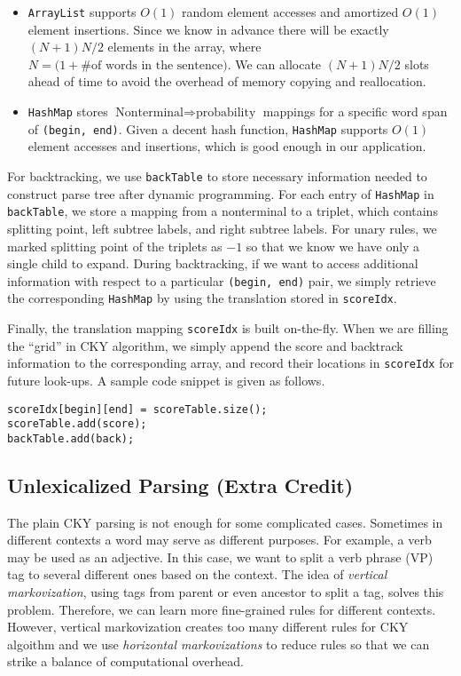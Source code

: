 \documentclass[letterpaper]{article}
\begin{document}
\begin{itemize}
\item \texttt{ArrayList} supports $O(1)$ random element accesses and amortized $O(1)$ element insertions. Since we know in advance there will be exactly $(N+1) N / 2$ elements in the array, where $N = \Big( 1 + \#\textrm{of words in the sentence} \Big)$. We can allocate $(N+1) N/2$ slots ahead of time
to avoid the overhead of memory copying and reallocation.

\item \texttt{HashMap} stores $\textrm{Nonterminal} \Longrightarrow \textrm{probability}$ mappings for a specific word span of \texttt{(begin, end)}. Given a decent hash function, \texttt{HashMap} supports $O(1)$ element accesses and insertions, which is good enough in our application.
\end{itemize}

For backtracking, we use \texttt{backTable} to store necessary information needed to construct parse tree after dynamic programming.
For each entry of \texttt{HashMap} in \texttt{backTable}, we store a mapping from a nonterminal to a triplet, which contains splitting point, left subtree labels, and right subtree labels.
For unary rules, we marked splitting point of the triplets as $-1$ so that we know we have only a single child to expand.
During backtracking, if we want to access additional information with respect to a particular \texttt{(begin, end)} pair, we simply retrieve the corresponding \texttt{HashMap} by using the translation stored in \texttt{scoreIdx}.

\vspace{0.25cm}

Finally, the translation mapping \texttt{scoreIdx} is built on-the-fly.
When we are filling the ``grid'' in CKY algorithm, we simply append the score and backtrack information to the corresponding array, and record their locations in \texttt{scoreIdx} for future look-ups. A sample code snippet is given as follows.
\begin{verbatim}
scoreIdx[begin][end] = scoreTable.size();
scoreTable.add(score);
backTable.add(back);
\end{verbatim}

\subsection{Unlexicalized Parsing (Extra Credit)}
The plain CKY parsing is not enough for some complicated cases. Sometimes in different contexts a word may serve as different purposes. For example, a verb may be used as an adjective. In this case, we want to split a verb phrase (VP) tag to several different ones based on the context. The idea of \textit{vertical markovization}, using tags from parent or even ancestor to split a tag, solves this problem. Therefore, we can learn more fine-grained rules for different contexts.
However, vertical markovization creates too many different rules for CKY algoithm and we use \textit{horizontal markovizations} to reduce rules so that we can strike a balance of computational overhead. 
\end{document}
